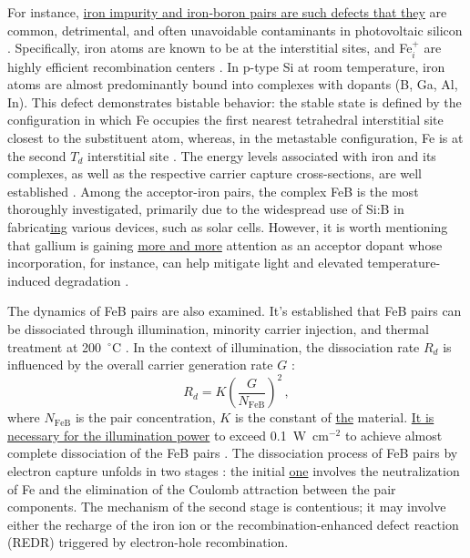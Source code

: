 \documentclass{WileyMSP-template}
\begin{document}
For instance, \textcolor[rgb]{0.00,0.07,1.00}{\uline{iron impurity and iron-boron pairs are such defects that they}} are common, detrimental, and often unavoidable contaminants in photovoltaic silicon \cite{Frascaroli2021,Sun2021}.
Specifically, iron atoms are known to be at the interstitial sites, and Fe$_i^+$ are highly efficient recombination centers \cite{WeberFe}.
In p-type Si at room temperature, iron atoms are almost predominantly bound into complexes with dopants (B, Ga, Al, In).
This defect demonstrates bistable behavior: the stable state is defined by the configuration in which Fe occupies
the first nearest tetrahedral interstitial site closest to the substituent atom,
whereas, in the metastable configuration, Fe is at the second $T_d$ interstitial site \cite{FeB:PhysRevB49}.
The energy levels associated with iron and its complexes, as well as the respective carrier capture cross-sections, are well established \cite{Juhl2018,ROUGIEUX2018}.
Among the acceptor-iron pairs, the complex FeB is the most thoroughly investigated,
primarily due to the widespread use of Si:B in fabricat\textcolor[rgb]{0.00,0.07,1.00}{\uline{ing}} various devices, such as solar cells.
However, it is worth mentioning that gallium is gaining \textcolor[rgb]{0.00,0.07,1.00}{\uline{more and more}} attention as an acceptor dopant whose incorporation,
for instance, can help mitigate light and elevated temperature-induced degradation \cite{Ning2022}.

The dynamics of FeB pairs are also examined.
It's established that FeB pairs can be dissociated through illumination, minority carrier injection, and thermal treatment at 200~$^\circ$C \cite{FeBAssJAP2014}.
In the context of illumination, the dissociation rate $R_d$ is influenced by the overall carrier generation rate $G$ \cite{FeBLight2,FeBAssJAP2014,FeBKin2019,FeMethod2012}:
\begin{equation}
\label{eqRd}
R_d=K\left(\frac{G}{N_\mathrm{FeB}}\right)^2\,,
\end{equation}
where
$N_\mathrm{FeB}$ is the pair concentration,
$K$ is the constant of \textcolor[rgb]{0.00,0.07,1.00}{\uline{the}} material.
\textcolor[rgb]{0.00,0.07,1.00}{\uline{It is necessary for the illumination power}} to exceed 0.1~W~cm$^{-2}$ to achieve almost complete dissociation of the FeB pairs \cite{Macdonald2004}.
The dissociation process of FeB pairs by electron capture unfolds in two stages \cite{KIMERLINGFeB,FeBAssJAP2014}:
the initial \textcolor[rgb]{0.00,0.07,1.00}{\uline{one}} involves the neutralization of Fe and the elimination of the Coulomb attraction between the pair components.
The mechanism of the second stage is contentious; it may involve either the recharge of the iron ion or the recombination-enhanced defect reaction
(REDR) triggered by electron-hole recombination.
\end{document}
